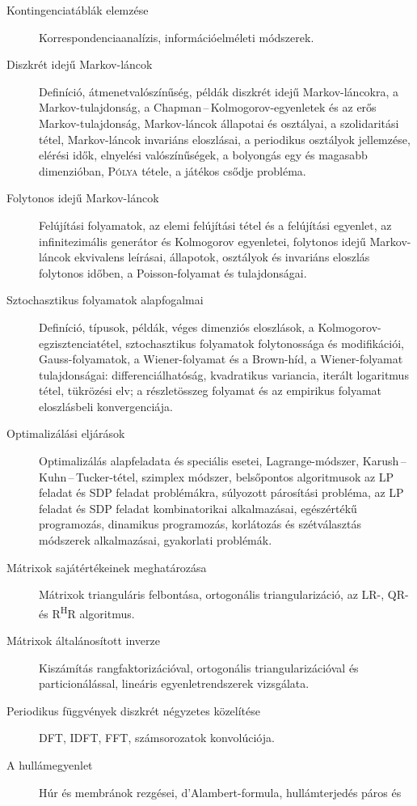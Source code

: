\documentclass[%
	DIV=15,appendixprefix]{scrreprt}
\theoremstyle{definition}
\theoremstyle{remark}
\begin{document}
\begin{description}
%
	\item[Kontingenciatáblák elemzése] Korrespondenciaanalízis, információelméleti módszerek.
%
	\item[Diszkrét idejű Markov-láncok] Definíció, átmenetvalószínűség, példák diszkrét idejű
	Markov-lán\-cok\-ra, a Markov-tulajdonság, a Chapman\,--\,Kolmogorov-egyenletek és az erős
	Markov-tu\-laj\-don\-ság, Markov-láncok állapotai és osztályai, a szolidaritási tétel, Markov-láncok
	invariáns eloszlásai, a periodikus osztályok jellemzése, elérési idők, elnyelési valószínűségek,
	a bolyongás egy és magasabb dimenzióban, \textsc{Pólya} tétele, a játékos csődje probléma.
%
	\item[Folytonos idejű Markov-láncok] Felújítási folyamatok, az elemi felújítási tétel és a
	felújítási egyenlet, az infinitezimális generátor és Kolmogorov egyenletei, folytonos idejű
	Markov-láncok ekvivalens leírásai, állapotok, osztályok és invariáns eloszlás folytonos időben,
	a Poisson-folyamat és tulajdonságai.
%
	\item[Sztochasztikus folyamatok alapfogalmai] Definíció, típusok, példák, véges dimenziós
	eloszlások, a Kolmogorov-egzisztenciatétel, sztochasztikus folyamatok folytonossága és
	modifikációi, Gauss-folyamatok, a Wiener-folyamat és a Brown-híd, a Wiener-folyamat
	tulajdonságai: differenciálhatóság, kvadratikus variancia, iterált logaritmus tétel, tükrözési
	elv; a részletösszeg folyamat és az empirikus folyamat eloszlásbeli konvergenciája.
%
	\item[Optimalizálási eljárások] Optimalizálás alapfeladata és speciális esetei,
	Lagrange-módszer, Karush\,--\,Kuhn\,--\,Tucker-tétel, szimplex módszer, belsőpontos algoritmusok
	az LP feladat és SDP feladat problémákra, súlyozott párosítási probléma, az LP feladat és SDP
	feladat kombinatorikai alkalmazásai, egészértékű programozás, dinamikus programozás, korlátozás
	és szétválasztás módszerek alkalmazásai, gyakorlati problémák.
%
	\item[Mátrixok sajátértékeinek meghatározása] Mátrixok trianguláris felbontása, ortogonális
	triangularizáció, az LR-, QR- és R\textsuperscript{H}R algoritmus.
%
	\item[Mátrixok általánosított inverze] Kiszámítás rangfaktorizációval, ortogonális
	triangularizációval és particionálással, lineáris egyenletrendszerek vizsgálata.
%
	\item[Periodikus függvények diszkrét négyzetes közelítése] DFT, IDFT, FFT, számsorozatok
	konvolúciója.
%
	\item[A hullámegyenlet] Húr és membránok rezgései, d'Alambert-formula, hullámterjedés páros és

\end{description}
\end{document}
